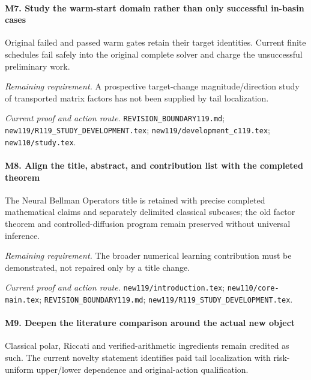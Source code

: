 \paragraph{M7. Study the warm-start domain rather than only successful in-basin cases}

Original failed and passed warm gates retain their target identities. Current finite schedules fail safely into the original complete solver and charge the unsuccessful preliminary work.

\par\emph{Remaining requirement.} A prospective target-change magnitude/\allowbreak{}direction study of transported matrix factors has not been supplied by tail localization.

\par\emph{Current proof and action route.} \nolinkurl{REVISION_BOUNDARY119.md}; \nolinkurl{new119/R119_STUDY_DEVELOPMENT.tex}; \nolinkurl{new119/development_c119.tex}; \nolinkurl{new110/study.tex}.

\paragraph{M8. Align the title, abstract, and contribution list with the completed theorem}

The Neural Bellman Operators title is retained with precise completed mathematical claims and separately delimited classical subcases; the old factor theorem and controlled-diffusion program remain preserved without universal inference.

\par\emph{Remaining requirement.} The broader numerical learning contribution must be demonstrated, not repaired only by a title change.

\par\emph{Current proof and action route.} \nolinkurl{new119/introduction.tex}; \nolinkurl{new110/core-main.tex}; \nolinkurl{REVISION_BOUNDARY119.md}; \nolinkurl{new119/R119_STUDY_DEVELOPMENT.tex}.

\paragraph{M9. Deepen the literature comparison around the actual new object}

Classical polar, Riccati and verified-arithmetic ingredients remain credited as such. The current novelty statement identifies paid tail localization with risk-uniform upper/\allowbreak{}lower dependence and original-action qualification.

